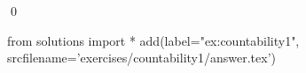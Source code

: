 
\begin{ex} 
  \label{ex:countability1}
  
  \qed
\end{ex} 
\begin{python0}
from solutions import *
add(label="ex:countability1",
    srcfilename='exercises/countability1/answer.tex') 
\end{python0}
